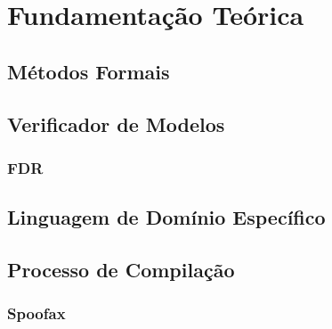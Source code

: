 \chapter{Fundamentação Teórica}

\section{Métodos Formais}
\section{Verificador de Modelos}
\subsection{FDR}
\section{Linguagem de Domínio Específico}
\section{Processo de Compilação}
\subsection{Spoofax}